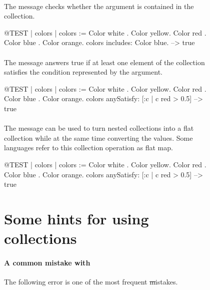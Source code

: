 \documentclass[a4paper,10pt,twoside]{book}
\begin{document}
\begin{figure}
\begin{center}
\paragraph{}
The message  checks whether the argument is contained in the collection. 

\begin{code}{@TEST | colors |}
colors := {Color white . Color yellow. Color red . Color blue . Color orange}.
colors includes: Color blue. --> true
\end{code}

\paragraph{}
The message  answers true if at least one element of the collection satisfies the condition represented by the argument.

\begin{code}{@TEST | colors | colors := {Color white . Color yellow. Color red . Color blue . Color orange}.}
colors anySatisfy: [:c | c red > 0.5] --> true
\end{code}

\paragraph{}
The message  can be used to turn nested collections into a flat collection while at the same time converting the values. Some languages refer to this collection operation as flat map.

\begin{code}{@TEST | colors | colors := {Color white . Color yellow. Color red . Color blue . Color orange}.}
colors anySatisfy: [:c | c red > 0.5] --> true
\end{code}

\section{Some hints for using collections}

\paragraph{A common mistake with }
The following error is one of the most frequent \st mistakes.


\end{center}
\end{figure}
\end{document}
